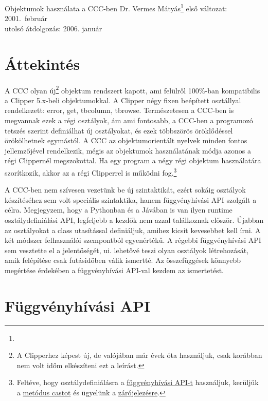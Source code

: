 \setcounter{secnumdepth}{1}  

\pagetitle%
{Objektumok használata a CCC-ben}%
{Dr. Vermes Mátyás\footnote{\ComFirm}}%
{első változat: 2001.\ február \\ utolsó átdolgozás: 2006. január}

\section{Áttekintés}

A CCC olyan új\footnote{A Clipperhez képest új, de valójában
már évek óta használjuk, csak korábban nem volt időm elkészíteni
ezt a leírást.}
objektum rendszert kapott, ami felülről 100\%-ban kompatibilis
a Clipper 5.x-beli objektumokkal. A Clipper négy fixen beépített 
osztállyal rendelkezett: error, get, tbcolumn, tbrowse. 
Természetesen a CCC-ben is megvannak ezek a régi osztályok,
ám ami fontosabb, a CCC-ben a programozó tetszés szerint definiálhat 
új osztályokat, és ezek többszörös öröklődéssel örökölhetnek egymástól. 
A CCC az objektumorientált nyelvek minden fontos jellemzőjével
rendelkezik, mégis az objektumok használatának módja azonos
a régi Clippernél megszokottal. Ha egy program a négy régi
objektum használatára szorítkozik, 
akkor az a régi Clipperrel is működni fog.\footnote{
Feltéve, hogy osztálydefiniálásra a 
\href{#funapi}{függvényhívási API-t} használjuk, kerüljük a 
\href{#metcast}{metódus castot} és ügyelünk a 
\href{#zarojel}{zárójelezésre}.}

A CCC-ben nem szívesen vezetünk be új szintaktikát, 
ezért sokáig osztályok készítéséhez sem volt speciális szintaktika, 
hanem  függvényhívási API szolgált a célra. 
Megjegyzem, hogy a Pythonban és a Jávában is van ilyen runtime 
osztálydefiniálási API, legfeljebb a kezdők nem azzal találkoznak először. 
Újabban az osztályokat a class utasítással definiáljuk, 
amihez kicsit kevesebbet kell írni. 
A két módszer felhasználói szempontból egyenértékű. 
A régebbi függvényhívási API sem vesztette el a jelentőségét, 
ui. lehetővé teszi olyan osztályok létrehozását, amik  felépítése
csak futásidőben válik ismertté.
Az összefüggések könnyebb megértése érdekében a függvényhívási API-val
kezdem az ismertetést.

\label{funapi}
\section{Függvényhívási API}

